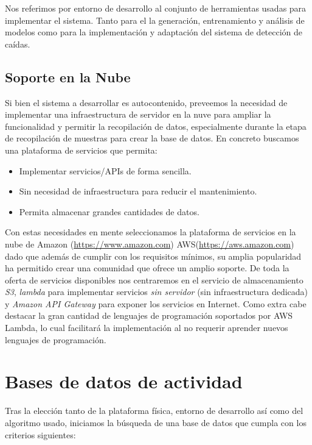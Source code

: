 Nos referimos por entorno de desarrollo al conjunto de herramientas usadas para implementar el sistema. Tanto para el la generación, entrenamiento y análisis de modelos como para la implementación y adaptación del sistema de detección de caídas.



\subsection{Soporte en la Nube}

Si bien el sistema a desarrollar es autocontenido, preveemos la necesidad de implementar una infraestructura de servidor en la nuve para ampliar la funcionalidad y permitir la recopilación de datos, especialmente durante la etapa de recopilación de muestras para crear la base de datos. En concreto buscamos una plataforma de servicios que permita:

\begin{itemize}
  \item Implementar servicios/APIs de forma sencilla.
  \item Sin necesidad de infraestructura para reducir el mantenimiento.
  \item Permita almacenar grandes cantidades de datos.
\end{itemize}

Con estas necesidades en mente seleccionamos la plataforma de servicios en la nube de Amazon (\url{https://www.amazon.com}) AWS(\url{https://aws.amazon.com}) dado que además de cumplir con los requisitos mínimos, su amplia popularidad ha permitido crear una comunidad que ofrece un amplio soporte. De toda la oferta de servicios disponibles nos centraremos en el servicio de almacenamiento \textit{S3}, \textit{lambda} para implementar servicios \textit{sin servidor} (sin infraestructura dedicada) y \textit{Amazon API Gateway} para exponer los servicios en Internet. Como extra cabe destacar la gran cantidad de lenguajes de programación soportados por AWS Lambda, lo cual facilitará la implementación al no requerir aprender nuevos lenguajes de programación.

\section{Bases de datos de actividad}\label{sec:req:bases_datos}

Tras la elección tanto de la plataforma física, entorno de desarrollo así como del algoritmo usado, iniciamos la búsqueda de una base de datos que cumpla con los criterios siguientes:

